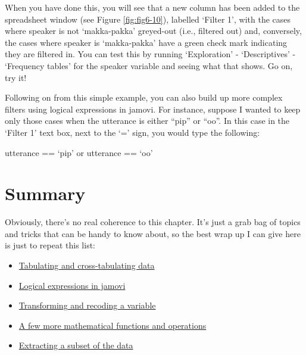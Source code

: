 \documentclass[
]{book}
\providecommand{\tightlist}{%
  \setlength{\itemsep}{0pt}\setlength{\parskip}{0pt}}
\begin{document}
When you have done this, you will see that a new column has been added to the spreadsheet window (see Figure \ref{fig:fig6-10}), labelled `Filter 1', with the cases where speaker is not `makka-pakka' greyed-out (i.e., filtered out) and, conversely, the cases where speaker is `makka-pakka' have a green check mark indicating they are filtered in. You can test this by running `Exploration' - `Descriptives' - `Frequency tables' for the speaker variable and seeing what that shows. Go on, try it!

Following on from this simple example, you can also build up more complex filters using logical expressions in jamovi. For instance, suppose I wanted to keep only those cases when the utterance is either ``pip'' or ``oo''. In this case in the `Filter 1' text box, next to the `=' sign, you would type the following:

utterance == `pip' or utterance == `oo'

\hypertarget{summary-4}{%
\section{Summary}\label{summary-4}}

Obviously, there's no real coherence to this chapter. It's just a grab bag of topics and tricks that can be handy to know about, so the best wrap up I can give here is just to repeat this list:

\begin{itemize}
\tightlist
\item
  \protect\hyperlink{tabulating-and-cross-tabulating-data}{Tabulating and cross-tabulating data}
\item
  \protect\hyperlink{logical-expressions-in-jamovi}{Logical expressions in jamovi}
\item
  \protect\hyperlink{transforming-and-recoding-a-variable}{Transforming and recoding a variable}
\item
  \protect\hyperlink{a-few-more-mathematical-functions-and-operations}{A few more mathematical functions and operations}
\item
  \protect\hyperlink{extracting-a-subset-of-the-data}{Extracting a subset of the data}
\end{itemize}
\end{document}

